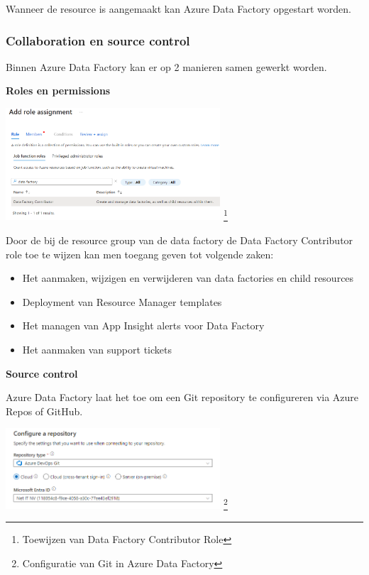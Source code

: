 Wanneer de resource is aangemaakt kan Azure Data Factory opgestart worden.

\subsubsection{Collaboration en source control}

Binnen Azure Data Factory kan er op 2 manieren samen gewerkt worden. 

\textbf{Roles en permissions}

\begin{center}
    \includegraphics[width=0.6\textwidth]{./graphics/adf/adf_contributor.png}
    \footnote{Toewijzen van Data Factory Contributor Role}
\end{center}

Door de bij de resource group van de data factory de Data Factory Contributor role toe te wijzen kan men toegang geven tot volgende zaken:
\begin{itemize}
    \item Het aanmaken, wijzigen en verwijderen van data factories en child resources
    \item Deployment van Resource Manager templates
    \item Het managen van App Insight alerts voor Data Factory
    \item Het aanmaken van support tickets
\end{itemize}

\textbf{Source control}

Azure Data Factory laat het toe om een Git repository te configureren via Azure Repos of GitHub. 

\begin{center}
    \includegraphics[width=0.6\textwidth]{./graphics/adf/setup_repository_2_specific.png}
    \footnote{Configuratie van Git in Azure Data Factory}
\end{center}

